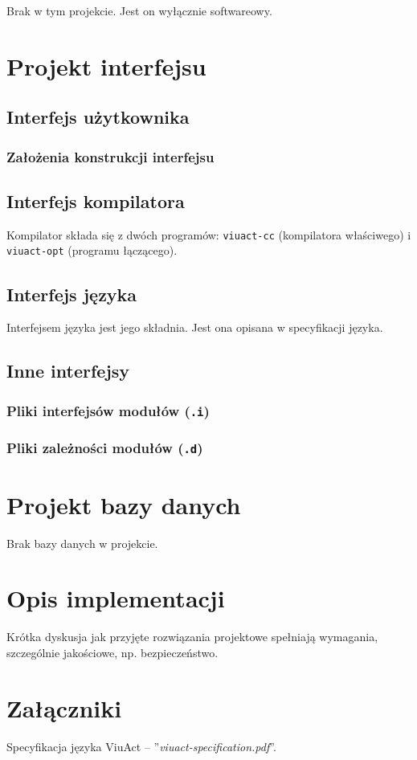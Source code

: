 \documentclass[11pt,oneside,a4paper,titlepage,onecolumn]{article}
\begin{document}
Brak w tym projekcie. Jest on wyłącznie softwareowy.

\section{Projekt interfejsu}

\subsection{Interfejs użytkownika}

\subsubsection{Założenia konstrukcji interfejsu}

\subsection{Interfejs kompilatora}

Kompilator składa się z dwóch programów: \texttt{viuact-cc} (kompilatora właściwego) i \texttt{viuact-opt}
(programu łączącego).

\subsection{Interfejs języka}

Interfejsem języka jest jego składnia.
Jest ona opisana w specyfikacji języka.

\subsection{Inne interfejsy}

\subsubsection{Pliki interfejsów modułów (\texttt{.i})}

\subsubsection{Pliki zależności modułów (\texttt{.d})}

\section{Projekt bazy danych}

Brak bazy danych w projekcie.

\section{Opis implementacji}

Krótka dyskusja jak przyjęte rozwiązania projektowe spełniają wymagania, szczególnie jakościowe, np.
bezpieczeństwo.

\section{Załączniki}

Specyfikacja języka ViuAct -- ''\emph{viuact-specification.pdf}''.
\end{document}
